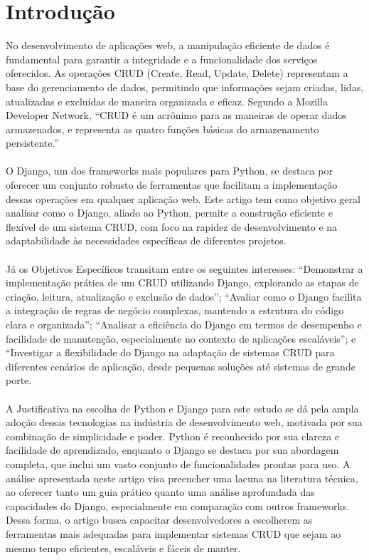 \documentclass[11pt]{article} %
\begin{document}
\section{Introdução}
No desenvolvimento de aplicações web, a manipulação eficiente de dados é fundamental para garantir a integridade e a funcionalidade dos serviços oferecidos. As operações CRUD (Create, Read, Update, Delete) representam a base do gerenciamento de dados, permitindo que informações sejam criadas, lidas, atualizadas e excluídas de maneira organizada e eficaz. Segundo a Mozilla Developer Network, “CRUD é um acrônimo para as maneiras de operar dados armazenados, e representa as quatro funções básicas do armazenamento persistente.”
 \\\\
O Django, um dos frameworks mais populares para Python, se destaca por oferecer um conjunto robusto de ferramentas que facilitam a implementação dessas operações em qualquer aplicação web. Este artigo tem como objetivo geral analisar como o Django, aliado ao Python, permite a construção eficiente e flexível de um sistema CRUD, com foco na rapidez de desenvolvimento e na adaptabilidade às necessidades específicas de diferentes projetos.
\\\\
Já os Objetivos Específicos transitam entre os seguintes interesses: “Demonstrar a implementação prática de um CRUD utilizando Django, explorando as etapas de criação, leitura, atualização e exclusão de dados”; “Avaliar como o Django facilita a integração de regras de negócio complexas, mantendo a estrutura do código clara e organizada”; “Analisar a eficiência do Django em termos de desempenho e facilidade de manutenção, especialmente no contexto de aplicações escaláveis”; e “Investigar a flexibilidade do Django na adaptação de sistemas CRUD para diferentes cenários de aplicação, desde pequenas soluções até sistemas de grande porte. 
\\\\
A Justificativa na escolha de Python e Django para este estudo se dá pela ampla adoção dessas tecnologias na indústria de desenvolvimento web, motivada por sua combinação de simplicidade e poder. Python é reconhecido por sua clareza e facilidade de aprendizado, enquanto o Django se destaca por sua abordagem completa, que inclui um vasto conjunto de funcionalidades prontas para uso. A análise apresentada neste artigo visa preencher uma lacuna na literatura técnica, ao oferecer tanto um guia prático quanto uma análise aprofundada das capacidades do Django, especialmente em comparação com outros frameworks. Dessa forma, o artigo busca capacitar desenvolvedores a escolherem as ferramentas mais adequadas para implementar sistemas CRUD que sejam ao mesmo tempo eficientes, escaláveis e fáceis de manter.
\end{document}
